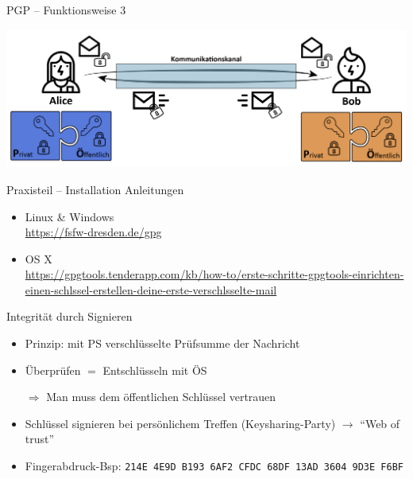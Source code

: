 \documentclass{beamer}
\begin{document}
\begin{frame}{PGP – Funktionsweise 3}
\begin{center}
\includegraphics[width=\textwidth]{img-src/pgp_kommunikationskanal.png}
\end{center}
\end{frame}

\begin{frame}[label=lk1]{Praxisteil – Installation}
  Anleitungen
  \begin{itemize}
    \item Linux \& Windows\\
    \url{https://fsfw-dresden.de/gpg}
    \item OS X\\
    \url{https://gpgtools.tenderapp.com/kb/how-to/erste-schritte-gpgtools-einrichten-einen-schlssel-erstellen-deine-erste-verschlsselte-mail}
  \end{itemize}
\end{frame}

  
\begin{frame}{Integrität durch Signieren}
  
  \begin{itemize}
   \item Prinzip: mit PS verschlüsselte Prüfsumme der Nachricht
   \item Überprüfen $=$ Entschlüsseln mit ÖS
   \item[$\Rightarrow$] Man muss dem öffentlichen Schlüssel vertrauen\\[2mm]
   
   \pause
   
   \item Schlüssel signieren bei persönlichem Treffen (Keysharing-Party) $\rightarrow$ "`Web of trust"'
   \item Fingerabdruck-Bsp: {\tiny \texttt{214E 4E9D B193 6AF2 CFDC 68DF 13AD 3604 9D3E F6BF}}
  \end{itemize}

\end{frame}
\end{document}
